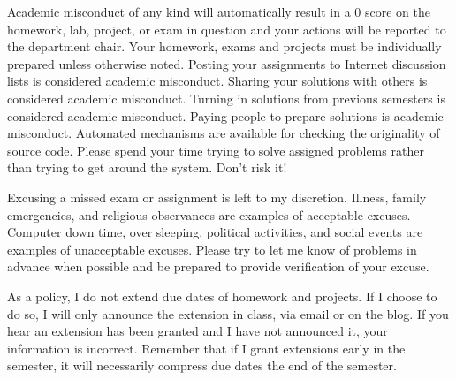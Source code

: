 \documentclass{tufte-handout}
\begin{document}
 Academic misconduct of any kind will
automatically result in a 0 score on the homework, lab, project, or
exam in question and your actions will be reported to the department
chair.  Your homework, exams and projects must be individually
prepared unless otherwise noted.  Posting your assignments to Internet
discussion lists is considered academic misconduct. Sharing your
solutions with others is considered academic misconduct.  Turning in
solutions from previous semesters is considered academic misconduct.
Paying people to prepare solutions is academic misconduct.  Automated
mechanisms are available for checking the originality of source
code. Please spend your time trying to solve assigned problems rather
than trying to get around the system.  Don't risk it!

 Excusing a missed exam or assignment is left to my
discretion. Illness, family emergencies, and religious observances are
examples of acceptable excuses. Computer down time, over sleeping,
political activities, and social events are examples of unacceptable
excuses. Please try to let me know of problems in advance when
possible and be prepared to provide verification of your excuse.

 As a policy, I do not extend due dates of
homework and projects.  If I choose to do so, I will only announce the
extension in class, via email or on the blog.  If you hear an
extension has been granted and I have not announced it, your
information is incorrect.  Remember that if I grant extensions early
in the semester, it will necessarily compress due dates the end of the
semester.
\end{document}
